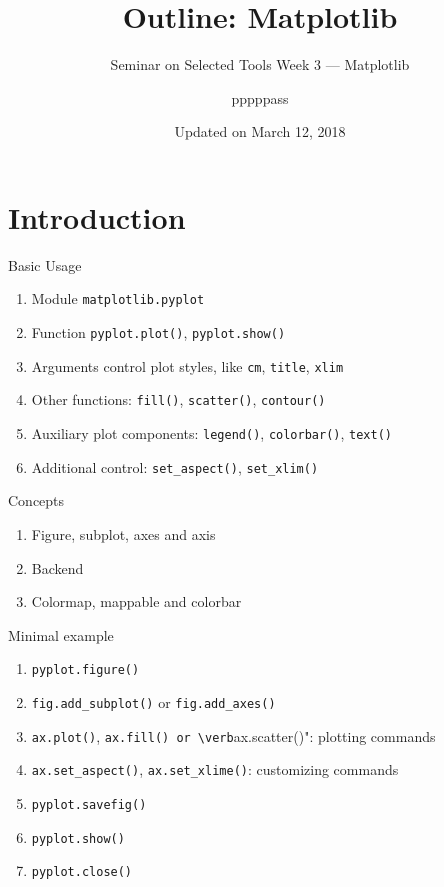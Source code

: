 \documentclass[english, nochinese]{../TeXTemplate/pkuslide}
\title{Outline: Matplotlib}
\subtitle{Seminar on Selected Tools Week 3 --- Matplotlib}
\author{pppppass}
\date{Updated on March 12, 2018}
\begin{document}
\begin{frame}
\titlepage
\end{frame}

\begin{frame}
\tableofcontents[subsectionstyle=show]
\end{frame}

\section{Introduction}

\begin{frame}
\sectionpage
\end{frame}

\begin{frame}[fragile]{Basic Usage}
\begin{enumerate}
\item Module \verb"matplotlib.pyplot"
\item Function \verb"pyplot.plot()", \verb"pyplot.show()"
\item Arguments control plot styles, like \verb"cm", \verb"title", \verb"xlim"
\item Other functions: \verb"fill()", \verb"scatter()", \verb"contour()"
\item Auxiliary plot components: \verb"legend()", \verb"colorbar()", \verb"text()"
\item Additional control: \verb"set_aspect()", \verb"set_xlim()"
\end{enumerate}
\end{frame}

\begin{frame}{Concepts}
\begin{enumerate}
\item Figure, subplot, axes and axis
\item Backend
\item Colormap, mappable and colorbar
\end{enumerate}
\end{frame}

\begin{frame}[fragile]{Minimal example}
\begin{enumerate}
\item \verb"pyplot.figure()"
\item \verb"fig.add_subplot()" or \verb"fig.add_axes()"
\item \verb"ax.plot()", \verb"ax.fill() or \verb"ax.scatter()": plotting commands
\item \verb"ax.set_aspect()", \verb"ax.set_xlime()": customizing commands
\item \verb"pyplot.savefig()"
\item \verb"pyplot.show()"
\item \verb"pyplot.close()"
\end{enumerate}
\end{frame}
\end{document}
